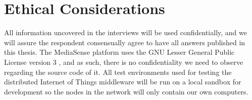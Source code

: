 \section{Ethical Considerations}
All information uncovered in the interviews will be used confidentially, and we will assure the respondent consensually agree to have all answers published in this thesis.
The MediaSense platform uses the GNU Lesser General Public License version 3 \cite{gnu}, and as such, there is no confidentiality we need to observe regarding the source code of it.
All test environments used for testing the distributed Internet of Things middleware will be run on a local sandbox for development so the nodes in the network will only contain our own computers. 
